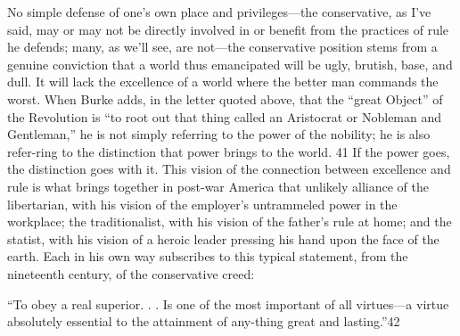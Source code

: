 No simple defense of one’s own place and privileges—the conservative, as I’ve said, may or may not be directly involved in or benefit from the practices of rule he defends; many, as we’ll see, are not—the conservative position stems from a genuine conviction that a world thus emancipated will be ugly, brutish, base, and dull. It will lack the excellence of a world where the better man commands the worst. When Burke adds, in the letter quoted above, that the “great Object” of the Revolution is “to root out that thing called an Aristocrat or Nobleman and Gentleman,” he is not simply referring to the power of the nobility; he is also refer-ring to the distinction that power brings to the world. {\color{blue}41} If the power goes, the distinction goes with it. This vision of the connection between excellence and rule is what brings together in post-war America that unlikely alliance of the libertarian, with his vision of the employer’s untrammeled power in the workplace; the traditionalist, with his vision of the father’s rule at home; and the statist, with his vision of a heroic leader pressing his hand upon the face of the earth. Each in his own way subscribes to this typical statement, from the nineteenth century, of the conservative creed:
 \par 
“To obey a real superior. . . Is one of the most important of all virtues—a virtue absolutely essential to the attainment of any-thing great and lasting.”{\color{blue}42}
 \par 
